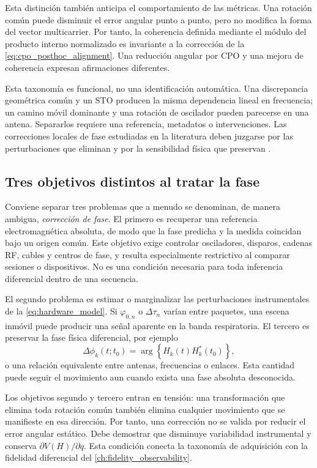 Esta distinción también anticipa el comportamiento de las métricas. Una rotación
común puede disminuir el error angular punto a punto, pero no modifica la forma
del vector multicarrier. Por tanto, la coherencia definida mediante el módulo del
producto interno normalizado es invariante a la corrección de la
\cref{eq:cpo_posthoc_alignment}. Una reducción angular por CPO y una mejora de
coherencia expresan afirmaciones diferentes.

Esta taxonomía es funcional, no una identificación automática. Una discrepancia
geométrica común y un STO producen la misma dependencia lineal en frecuencia;
un camino móvil dominante y una rotación de oscilador pueden parecerse en una
antena. Separarlos requiere una referencia, metadatos o intervenciones. Las
correcciones locales de fase estudiadas en la literatura deben juzgarse por las
perturbaciones que eliminan y por la sensibilidad física que preservan
\citep{Ruah2024Phase}.

\subsection{Tres objetivos distintos al tratar la fase}

Conviene separar tres problemas que a menudo se denominan, de manera ambigua,
\emph{corrección de fase}. El primero es recuperar una referencia electromagnética
absoluta, de modo que la fase predicha y la medida coincidan bajo un origen común.
Este objetivo exige controlar osciladores, disparos, cadenas RF, cables y centros
de fase, y resulta especialmente restrictivo al comparar sesiones o dispositivos.
No es una condición necesaria para toda inferencia diferencial dentro de una
secuencia.

El segundo problema es estimar o marginalizar las perturbaciones instrumentales de
la \cref{eq:hardware_model}. Si $\varphi_{0,n}$ o $\Delta\tau_n$ varían entre
paquetes, una escena inmóvil puede producir una señal aparente en la banda
respiratoria. El tercero es preservar la fase física diferencial, por ejemplo
\begin{equation}
\Delta\phi_k(t;t_0)=
\arg\!\left\{H_k(t)H_k^*(t_0)\right\},
\label{eq:differential_physical_phase}
\end{equation}
o una relación equivalente entre antenas, frecuencias o enlaces. Esta cantidad
puede seguir el movimiento aun cuando exista una fase absoluta desconocida.

Los objetivos segundo y tercero entran en tensión: una transformación que elimina
toda rotación común también elimina cualquier movimiento que se manifieste en esa
dirección. Por tanto, una corrección no se valida por reducir el error angular
estático. Debe demostrar que disminuye variabilidad instrumental y conserva
$\partial V(H)/\partial q$. Esta condición conecta la taxonomía de adquisición con
la fidelidad diferencial del \cref{ch:fidelity_observability}.


